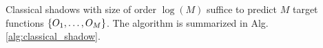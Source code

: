 \documentclass[
reprint,
aps,
pra,
floatfix,
]{revtex4-2}
\theoremstyle{plain}
\newtheorem{theorem}{Theorem}
\newtheorem{lemma}{Lemma}
\theoremstyle{definition}
\newtheorem{definition}{Definition}
\newcommand{\ob}{O}
\newcommand{\dm}{\rho}
\newcommand{\shadow}{\textup{shadow}}
\newcommand{\U}{U}
\begin{document}
Classical shadows with size of order $\log(M)$ suffice to predict $M$ target functions $\qty{\ob_1,\dots,\ob_M}$.
The algorithm is summarized in Alg. \ref{alg:classical_shadow}.
\end{document}
